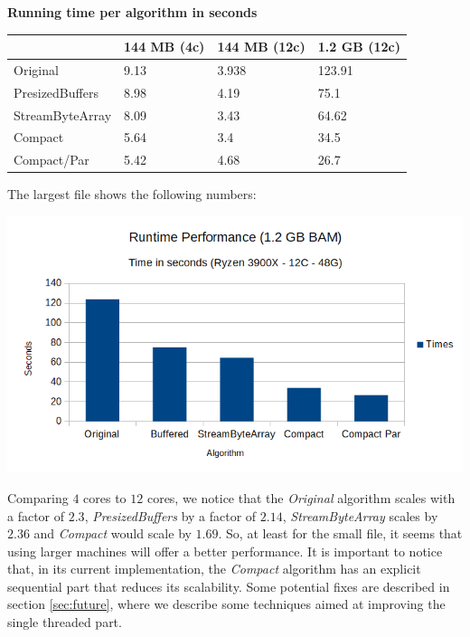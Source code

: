 \documentclass[a4paper,twoside]{article}
\begin{document}
\begin{small}
\begin{center}
\textbf{Running time per algorithm in seconds} \\
\begin{tabular}{|C{2cm}|C{1.2cm}|C{1.2cm}|C{1.2cm}|}
\hline
						& 144 MB (4c)	& 144 MB (12c)		& 1.2 GB (12c)	\\ \hline
Original				& 9.13 			& 3.938 			& 123.91 		\\ \hline
PresizedBuffers			& 8.98 			& 4.19 				& 75.1 			\\ \hline
StreamByteArray			& 8.09 			& 3.43 				& 64.62 		\\ \hline
Compact 				& 5.64 			& 3.4 	 			& 34.5			\\ \hline
Compact/Par 			& 5.42		    & 4.68				& 26.7 			\\ \hline
\end{tabular}
\end{center}
\end{small}

The largest file shows the following numbers:
\begin{center}
	\includegraphics[scale=0.5]{images/runtime_perf_1_2G.png}
\end{center}

Comparing $4$ cores to $12$ cores, we notice that the {\textit{Original} } algorithm scales with a factor of $2.3$, {\textit{PresizedBuffers} } by a factor of $2.14$, {\textit{StreamByteArray} } scales by $2.36$ and {\textit{Compact} } would scale by $1.69$. So, at least for the small file, it seems that using larger machines will offer a better performance. It is important to notice that, in its current implementation, the {\textit{Compact} } algorithm has an explicit sequential part that reduces its scalability.
Some potential fixes are described in section \ref{sec:future}, where we describe some techniques aimed at improving the single threaded part.
\end{document}
